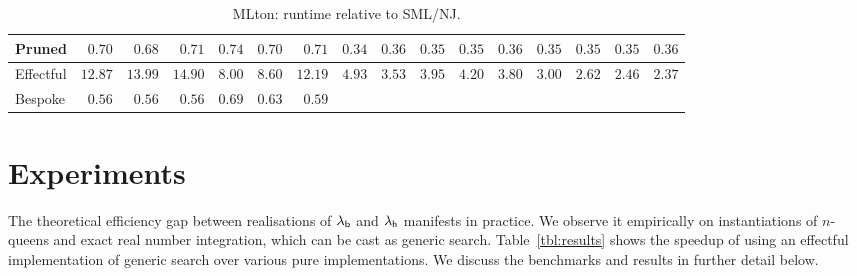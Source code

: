 \documentclass[12pt,phd,lfcs,twoside,openright,logo,leftchapter,normalheadings]{infthesis}
\theoremstyle{plain}
\theoremstyle{definition}
\begin{document}
{\begin{table*}
\begin{tabular}{@{}| l | r@{\,} | r@{\,} | r@{\,} |@{\,}| r@{\,} | r@{\,} | r@{\,} |@{\,}| r@{\,} |@{\,}| r@{\,} | r@{\,} | r@{\,} |@{\,}| r@{\,} | r@{\,} | r@{\,} | r@{\,} | r@{\,} |@{}}
    Pruned &
    $0.70$ &
    $0.68$ &
    $0.71$ &
    $0.74$ &
    $0.70$ &
    $0.71$ &
    $0.34$ &
    $0.36$ &
    $0.35$ &
    $0.35$ &
    $0.36$ &
    $0.35$ &
    $0.35$ &
    $0.35$ &
    $0.36$
    \\\hline

    Effectful &
    $12.87$ &
    $13.99$ &
    $14.90$ &
    $8.00$ &
    $8.60$ &
    $12.19$ &
    $4.93$ &
    $3.53$ &
    $3.95$ &
    $4.20$ &
    $3.80$ &
    $3.00$ &
    $2.62$ &
    $2.46$ &
    $2.37$
    \\\cline{1-16}

    Bespoke &
    $0.56$ &
    $0.56$ &
    $0.56$ &
    $0.69$ &
    $0.63$ &
    $0.59$ &
    \multicolumn{9}{l}{}
    \\\cline{1-7}
  \end{tabular}
  \caption{MLton: runtime relative to SML/NJ.}
  \label{tbl:results-mlton-vs-smlnj}
\end{table*}}

\tableone
\tablesmlnjintegration
\tabletwo
\tablemltonintegration

\section{Experiments}
\label{sec:experiments}
The theoretical efficiency gap between realisations of $\lambda_{\mathsf{b}}$ and
$\lambda_{\mathsf{h}}$ manifests in practice. We observe it empirically on
instantiations of $n$-queens and exact real number integration, which
can be cast as generic search. Table~\ref{tbl:results} shows the
speedup of using an effectful implementation of generic search over
various pure implementations. We discuss the benchmarks and results in
further detail below.

\setlength{\floatsep}{1.0ex}
\setlength{\textfloatsep}{1.0ex}
\end{document}
